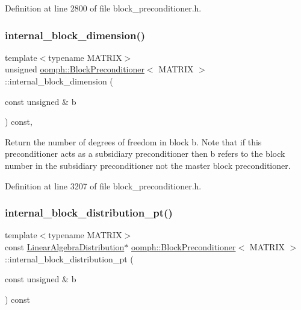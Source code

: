 Definition at line 2800 of file block\+\_\+preconditioner.\+h.

\mbox{\label{classoomph_1_1BlockPreconditioner_ac460225afc092cc5ed9d77acc6316536}} 
\subsubsection{\texorpdfstring{internal\+\_\+block\+\_\+dimension()}{internal\_block\_dimension()}}
{\footnotesize\ttfamily template$<$typename M\+A\+T\+R\+IX$>$ \\
unsigned \hyperlink{classoomph_1_1BlockPreconditioner}{oomph\+::\+Block\+Preconditioner}$<$ M\+A\+T\+R\+IX $>$\+::internal\+\_\+block\+\_\+dimension (\begin{DoxyParamCaption}\item[{const unsigned \&}]{b }\end{DoxyParamCaption}) const\hspace{0.3cm}{\ttfamily [inline]}, {\ttfamily [protected]}}



Return the number of degrees of freedom in block b. Note that if this preconditioner acts as a subsidiary preconditioner then b refers to the block number in the subsidiary preconditioner not the master block preconditioner. 



Definition at line 3207 of file block\+\_\+preconditioner.\+h.

\mbox{\label{classoomph_1_1BlockPreconditioner_a19f8ca9f40ab804262cf95c1d5eb598c}} 
\subsubsection{\texorpdfstring{internal\+\_\+block\+\_\+distribution\+\_\+pt()}{internal\_block\_distribution\_pt()}}
{\footnotesize\ttfamily template$<$typename M\+A\+T\+R\+IX$>$ \\
const \hyperlink{classoomph_1_1LinearAlgebraDistribution}{Linear\+Algebra\+Distribution}$\ast$ \hyperlink{classoomph_1_1BlockPreconditioner}{oomph\+::\+Block\+Preconditioner}$<$ M\+A\+T\+R\+IX $>$\+::internal\+\_\+block\+\_\+distribution\+\_\+pt (\begin{DoxyParamCaption}\item[{const unsigned \&}]{b }\end{DoxyParamCaption}) const\hspace{0.3cm}{\ttfamily [inline]}}



